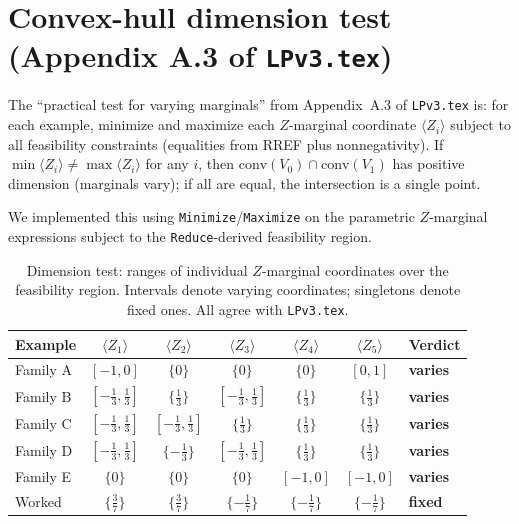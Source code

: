 \documentclass{article}
\newcommand{\conv}{\mathrm{conv}}
\begin{document}
\section{Convex-hull dimension test (Appendix A.3 of \texttt{LPv3.tex})}
\label{sec:convhull}

The ``practical test for varying marginals'' from Appendix~A.3 of \texttt{LPv3.tex} is:
for each example, minimize and maximize each $Z$-marginal coordinate $\langle Z_i\rangle$ subject to all feasibility constraints (equalities from RREF plus nonnegativity).
If $\min\langle Z_i\rangle\neq\max\langle Z_i\rangle$ for any $i$, then $\conv(V_0)\cap\conv(V_1)$ has positive dimension (marginals vary); if all are equal, the intersection is a single point.

We implemented this using \texttt{Minimize}/\texttt{Maximize} on the parametric $Z$-marginal expressions subject to the \texttt{Reduce}-derived feasibility region.

\begin{table}[ht]
\centering
\begin{tabular}{lcccccl}
\toprule
Example & $\langle Z_1\rangle$ & $\langle Z_2\rangle$ & $\langle Z_3\rangle$ & $\langle Z_4\rangle$ & $\langle Z_5\rangle$ & Verdict \\
\midrule
Family A & $[-1,0]$ & $\{0\}$ & $\{0\}$ & $\{0\}$ & $[0,1]$ & \textbf{varies} \\
Family B & $[-\frac13,\frac13]$ & $\{\frac13\}$ & $[-\frac13,\frac13]$ & $\{\frac13\}$ & $\{\frac13\}$ & \textbf{varies} \\
Family C & $[-\frac13,\frac13]$ & $[-\frac13,\frac13]$ & $\{\frac13\}$ & $\{\frac13\}$ & $\{\frac13\}$ & \textbf{varies} \\
Family D & $[-\frac13,\frac13]$ & $\{-\frac13\}$ & $[-\frac13,\frac13]$ & $\{\frac13\}$ & $\{\frac13\}$ & \textbf{varies} \\
Family E & $\{0\}$ & $\{0\}$ & $\{0\}$ & $[-1,0]$ & $[-1,0]$ & \textbf{varies} \\
Worked & $\{\frac37\}$ & $\{\frac37\}$ & $\{-\frac17\}$ & $\{-\frac17\}$ & $\{-\frac17\}$ & \textbf{fixed} \\
\bottomrule
\end{tabular}
\caption{Dimension test: ranges of individual $Z$-marginal coordinates over the feasibility region. Intervals denote varying coordinates; singletons denote fixed ones. All agree with \texttt{LPv3.tex}.}
\label{tab:dimtest}
\end{table}
\end{document}

